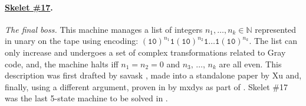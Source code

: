 
\paragraph{\href{https://bbchallenge.org/1RB---_0LC1RE_0LD1LC_1RA1LB_0RB0RA}{Skelet \#17}.} \textit{The final boss.} This machine manages a list of integers $n_1, \dots, n_k \in \mathbb{N}$ represented in unary on the tape using encoding: $(\texttt{10})^{n_1} \texttt{1} (\texttt{10})^{n_2} \texttt{1} \dots \texttt{1} (\texttt{10})^{n_k}$. The list can only increase and undergoes a set of complex transformations related to Gray code, and, the machine halts iff $n_1 = n_2 = 0$ and $n_3,\, \dots,\, n_k$ are all even. This description was first drafted by savask \cite{savaskSk17}, made into a standalone paper by Xu \cite{xu2024skelet17fifthbusy} and, finally, using a different argument, proven in \Coq by mxdys as part of \CoqBB. Skelet \#17 was the last 5-state machine to be solved in \Coq.
